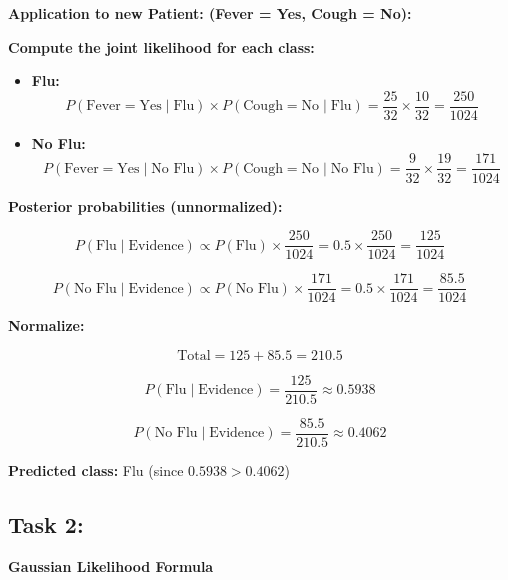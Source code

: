 \documentclass[a4paper,12pt]{article}
\begin{document}
\vspace{1cm}

\textbf{Application to new Patient: (Fever = Yes, Cough = No):}

\vspace{0.3cm}

\textbf{Compute the joint likelihood for each class:}

\begin{itemize}
    \item \textbf{Flu:}
    \[
    P(\text{Fever} = \text{Yes} \mid \text{Flu}) \times P(\text{Cough} = \text{No} \mid \text{Flu}) 
    = \frac{25}{32} \times \frac{10}{32} = \frac{250}{1024}
    \]

    \item \textbf{No Flu:}
    \[
    P(\text{Fever} = \text{Yes} \mid \text{No Flu}) \times P(\text{Cough} = \text{No} \mid \text{No Flu}) 
    = \frac{9}{32} \times \frac{19}{32} = \frac{171}{1024}
    \]
\end{itemize}

\vspace{0.3cm}

\textbf{Posterior probabilities (unnormalized):}

\[
P(\text{Flu} \mid \text{Evidence}) \propto P(\text{Flu}) \times \frac{250}{1024} = 0.5 \times \frac{250}{1024} = \frac{125}{1024}
\]

\[
P(\text{No Flu} \mid \text{Evidence}) \propto P(\text{No Flu}) \times \frac{171}{1024} = 0.5 \times \frac{171}{1024} = \frac{85.5}{1024}
\]

\vspace{0.3cm}

\textbf{Normalize:}

\[
\text{Total} = 125 + 85.5 = 210.5
\]

\[
P(\text{Flu} \mid \text{Evidence}) = \frac{125}{210.5} \approx 0.5938
\]

\[
P(\text{No Flu} \mid \text{Evidence}) = \frac{85.5}{210.5} \approx 0.4062
\]

\vspace{0.3cm}

\textbf{Predicted class:} Flu (since $0.5938 > 0.4062$)


\newpage

\subsection*{Task 2:}


\textbf{Gaussian Likelihood Formula}
\end{document}
